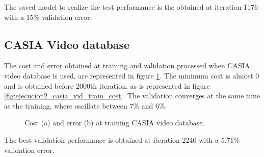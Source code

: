 The saved model to realize the test performance is the obtained at iteration 1176 with a 15\% validation error.\\

\subsection{CASIA Video database}
The cost and error obtained at training and validation processed when CASIA video database is used, are represented in figure \ref{fig:ejecucion2_casia_vid_train}. The minimum cost is almost 0 and is obtained before 2000th iteration, as is represented in figure \ref{fig:ejecucion2_casia_vid_train_cost}. The validation converges at the same time as the training, where oscillate between 7\% and 6\%.\\
\begin{figure}[htb]
\centering
\caption{Cost (a) and error (b) at training CASIA video database.}
\label{fig:ejecucion2_casia_vid_train}
\end{figure}

The best validation performance is obtained at iteration 2240 with a 5.71\% validation error.\\

